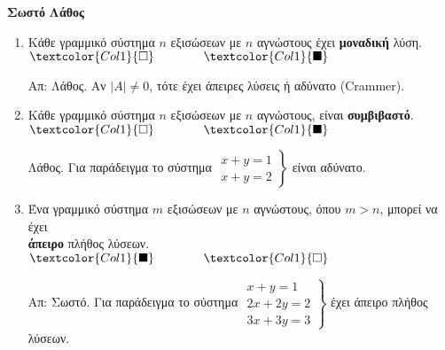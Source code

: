



\pagestyle{askhseis}




\begin{center}
  \minibox{\large\bfseries \textcolor{Col2}{Συστήματα Γραμμικών Εξισώσεων}}
\end{center}


\vspace{\baselineskip}

\hfill \textcolor{Col1}{\textbf{Σωστό}} \quad \textcolor{Col1}{\textbf{Λάθος}}
\begin{enumerate}[itemsep=.5\baselineskip]
  \item \textcolor{Col1}{Κάθε γραμμικό σύστημα $n$ εξισώσεων με $n$ αγνώστους έχει 
    \textbf{μοναδική} λύση}. 
    \hfill $\textcolor{Col1}{\square} \qquad \qquad \textcolor{Col1}{\blacksquare}$

    Απ: Λάθος. Αν $ |A| \neq 0 $, τότε έχει άπειρες λύσεις ή αδύνατο (Crammer).

  \item \textcolor{Col1}{Κάθε γραμμικό σύστημα $n$ εξισώσεων με $n$ αγνώστους, 
    είναι \textbf{συμβιβαστό}}.
    \hfill $\textcolor{Col1}{\square} \qquad \qquad \textcolor{Col1}{\blacksquare}$

    Λάθος. Για παράδειγμα το σύστημα $ \left.
      \begin{matrix}
        x+y=1 \\
        x+y=2
      \end{matrix} 
    \right\}$ είναι αδύνατο.

  \item \textcolor{Col1}{Ένα γραμμικό σύστημα $m$ εξισώσεων με $n$ αγνώστους, όπου 
    $ m>n $, μπορεί να έχει \\ \textbf{άπειρο} πλήθος λύσεων}.
    \hfill $\textcolor{Col1}{\blacksquare} \qquad \qquad \textcolor{Col1}{\square}$

    Απ: Σωστό. Για παράδειγμα το σύστημα $ \left.
      \begin{matrix}
        x+y=1 \\
        2x+2y=2 \\
        3x+3y=3
      \end{matrix} 
    \right\} $ έχει άπειρο πλήθος λύσεων.


\end{enumerate}
